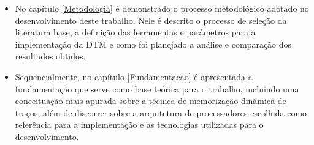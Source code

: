 \begin{itemize}


	\item No capítulo \ref{Metodologia} é demonstrado o processo metodológico adotado no desenvolvimento deste trabalho. Nele é descrito o processo de seleção da literatura base, a definição das ferramentas e parâmetros para a implementação da DTM e como foi planejado a análise e comparação dos resultados obtidos.

	\item Sequencialmente, no capítulo \ref{Fundamentacao} é apresentada a fundamentação que serve como base teórica para o trabalho, incluindo uma conceituação mais apurada sobre a técnica de memorização dinâmica de traços, além de discorrer sobre a arquitetura de processadores escolhida como referência para a implementação e as tecnologias utilizadas para o desenvolvimento.
	
%	
%	
	
\end{itemize}